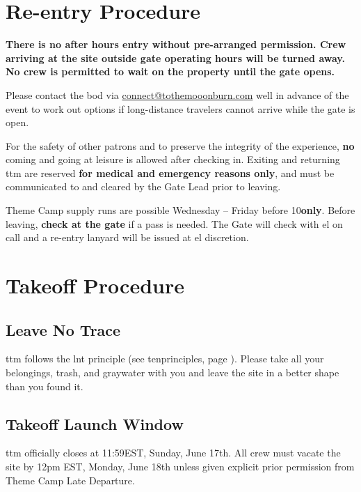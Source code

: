 \section*{Re-entry Procedure}

\textbf{There is no after hours entry without pre-arranged permission.  Crew arriving at the site outside gate operating hours will be turned away.  No crew is permitted to wait on the property until the gate opens.}

Please contact the \gls{bod} via \url{connect@tothemooonburn.com} well in advance of the event to work out options if long-distance travelers cannot arrive while the gate is open.

For the safety of other patrons and to preserve the integrity of the experience, \textbf{no} coming and going at leisure is allowed after checking in.  Exiting and returning \gls{ttm} are reserved \textbf{for medical and emergency reasons only}, and must be communicated to and cleared by the Gate Lead prior to leaving.

Theme Camp supply runs are possible Wednesday -- Friday before 10\pm \textbf{only}. Before leaving, \textbf{check at the gate} if a pass is needed. The Gate will check with \Gls{el} on call and a re-entry lanyard will be issued at \gls{el} discretion.


\section*{Takeoff Procedure}
\subsection*{Leave No Trace}
\Gls{ttm} follows the \gls{lnt} principle (see \gls{tenprinciples}, page \pageref{tenprinciples}). Please take all your belongings, trash, and \gls{graywater} with you and leave the site in a better shape than you found it.

\subsection*{Takeoff Launch Window}

\Gls{ttm} officially closes at 11:59\pm EST, Sunday, June 17th.  All crew must vacate the site by 12pm EST, Monday, June 18th unless given explicit prior permission from Theme Camp Late Departure.

